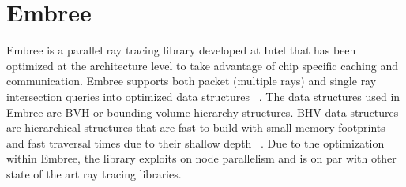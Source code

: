 \section{Embree}
\label{sec:embree}
Embree is a parallel ray tracing library developed at Intel that has been 
optimized at the architecture level to take advantage of chip specific caching 
and communication.  Embree supports both packet (multiple rays) and single ray 
intersection queries into optimized data structures ~\cite{wald2014embree}. The 
data structures used in Embree are BVH or bounding volume hierarchy structures.  
BHV data structures are hierarchical structures that are fast to build with 
small memory footprints and fast traversal times due to their shallow depth 
~\cite{wald2014embree}.  Due to the optimization within Embree, the library 
exploits on node parallelism and is on par with other state of the art ray 
tracing libraries. 

